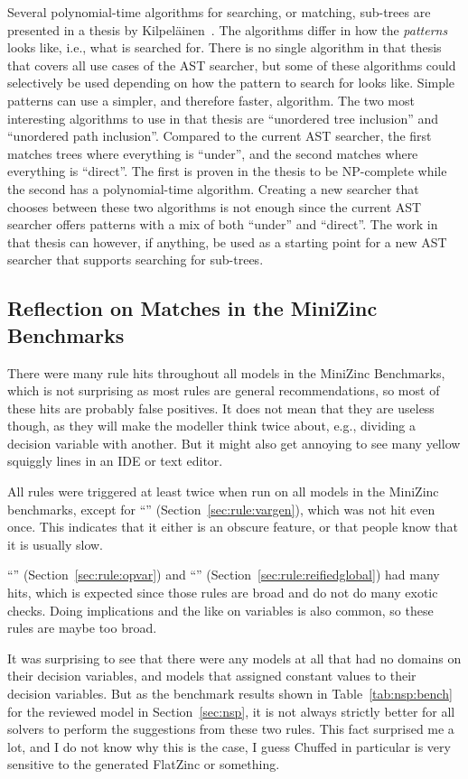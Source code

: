 \documentclass[a4paper,12pt]{article}
\newcommand{\ruleref}[1]{``\nameref{sec:rule:#1}'' (Section~\ref{sec:rule:#1})}
\begin{document}
Several polynomial-time algorithms for searching, or matching, sub-trees are presented in
a thesis by Kilpeläinen~\cite{kilpelainen92}. %
The algorithms differ in how the \emph{patterns} looks like, i.e., what is searched for.
There is no single algorithm in that thesis that covers all use cases of the AST searcher,
but some of these algorithms could selectively be used depending on how the pattern to
search for looks like. Simple patterns can use a simpler, and therefore faster, algorithm.
The two most interesting algorithms to use in that thesis are ``unordered tree inclusion''
and ``unordered path inclusion''. Compared to the current AST searcher, the first matches
trees where everything is ``under'', and the second matches where everything is
``direct''. The first is proven in the thesis to be NP-complete while the second has a
polynomial-time algorithm. Creating a new searcher that chooses between these two
algorithms is not enough since the current AST searcher offers patterns with a mix of
both ``under'' and ``direct''. The work in that thesis can however, if anything, be used as a
starting point for a new AST searcher that supports searching for sub-trees.

\subsection{Reflection on Matches in the MiniZinc Benchmarks}
There were many rule hits throughout all models in the MiniZinc Benchmarks, which is not
surprising as most rules are general recommendations, so most of these hits are probably
false positives. It does not mean that they are useless though, as they will make the
modeller think twice about, e.g., dividing a decision variable with another. But it might
also get annoying to see many yellow squiggly lines in an IDE or text editor.

All rules were triggered at least twice when run on all models in the MiniZinc benchmarks,
except for \ruleref{vargen}, which was not hit even once. This indicates that it
either is an obscure feature, or that people know that it is usually slow.

\ruleref{opvar} and \ruleref{reifiedglobal} had many hits,
which is expected since those rules are broad and do not do many exotic checks.
Doing implications and the like on variables is also common, so these rules are maybe too broad.

It was surprising to see that there were any models at all that had no domains on their
decision variables, and models that assigned constant values to their decision variables.
But as the benchmark results shown in Table~\ref{tab:nsp:bench} for the reviewed model in
Section~\ref{sec:nsp}, it is not always strictly better for all solvers to perform the
suggestions from these two rules. This fact surprised me a lot, and I do not know why this is the case, I guess
Chuffed in particular is very sensitive to the generated FlatZinc or something.
\end{document}
